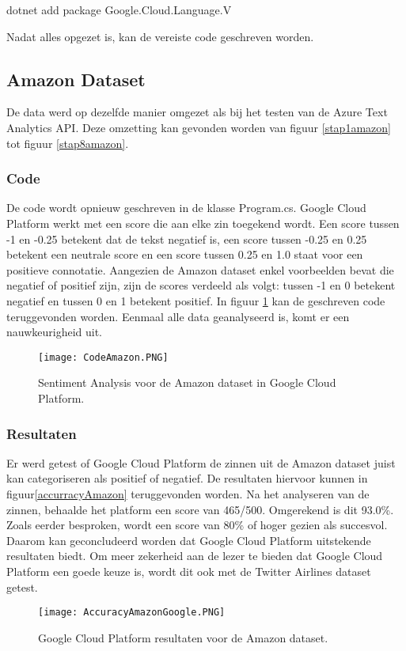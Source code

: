dotnet add package Google.Cloud.Language.V

Nadat alles opgezet is, kan de vereiste code geschreven worden.


\subsection{Amazon Dataset}
\label{amazongoogleplatform}

De data werd op dezelfde manier omgezet als bij het testen van de Azure Text Analytics API. Deze omzetting kan gevonden worden van figuur \ref{stap1amazon} tot figuur \ref{stap8amazon}.

\subsubsection{Code}
\label{amazoncodegoogleplatform}
De code wordt opnieuw geschreven in de klasse Program.cs. Google Cloud Platform werkt met een score die aan elke zin toegekend wordt. Een score tussen -1 en -0.25 betekent dat de tekst negatief is, een score tussen -0.25 en 0.25 betekent een neutrale score en een score tussen 0.25 en 1.0 staat voor een positieve connotatie. Aangezien de Amazon dataset enkel voorbeelden bevat die negatief of positief zijn, zijn de scores verdeeld als volgt: tussen -1 en 0 betekent negatief en tussen 0 en 1 betekent positief. In figuur \ref{codeamazon} kan de geschreven code teruggevonden worden. Eenmaal alle data geanalyseerd is, komt er een nauwkeurigheid uit. 

\begin{figure}[!htbp]
    \texttt{[image: CodeAmazon.PNG]}
    \caption{\label{codeamazon}Sentiment Analysis voor de Amazon dataset in Google Cloud Platform.}
\end{figure}
\FloatBarrier 

\subsubsection{Resultaten}
\label{amazonresultatengoogleplatform}

Er werd getest of Google Cloud Platform de zinnen uit de Amazon dataset juist kan categoriseren als positief of negatief. De resultaten hiervoor kunnen in figuur\ref{accurracyAmazon} teruggevonden worden. Na het analyseren van de zinnen, behaalde het platform een score van 465/500. Omgerekend is dit 93.0\%. Zoals eerder besproken, wordt een score van 80\% of hoger gezien als succesvol. Daarom kan geconcludeerd worden dat Google Cloud Platform uitstekende resultaten biedt. Om meer zekerheid aan de lezer te bieden dat Google Cloud Platform een goede keuze is, wordt dit ook met de Twitter Airlines dataset getest. 
\begin{figure}[!htbp]
    \texttt{[image: AccuracyAmazonGoogle.PNG]}
    \caption{\label{accuracyAmazon}Google Cloud Platform resultaten voor de Amazon dataset.}
\end{figure}
\FloatBarrier 

